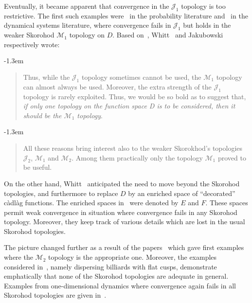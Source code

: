 \documentclass[12pt]{article}
\numberwithin{equation}{section}
\newcommand{\cJ}{{\mathcal J}}
\newcommand{\cM}{{\mathcal M}}
\begin{document}
Eventually, it became apparent that convergence in the $\cJ_1$ topology is too restrictive.
The first such examples were~\cite{AvramTaqqu92,BasrakKrizmanicSegers12} in the probability literature and~\cite{MZ15} in the dynamical systems literature, where convergence fails in $\cJ_1$ but holds in the weaker Skorohod $\cM_1$ topology on $D$.
Based on~\cite{AvramTaqqu92}, Whitt~\cite[p.~xii]{Whitt} and 
Jakubowski~\cite{Jakubowski07} 
respectively wrote:
{\advance\leftmargini -1.3em
\begin{quote}
Thus, while the $\cJ_1$ topology sometimes cannot be used, the
$\cM_1$ topology can almost always be used. Moreover, the extra strength of the $\cJ_1$
topology is rarely exploited. Thus, we would be so bold as to suggest that, \emph{if only
one topology on the function space D is to be considered, then it should be the $\cM_1$
topology}.
\end{quote}
}
{\advance\leftmargini -1.3em
\begin{quote}
All these reasons bring interest also to the
weaker Skorokhod's topologies $\cJ_2$, $\cM_1$ and $\cM_2$. Among them practically only
the topology $\cM_1$ proved to be useful.
\end{quote}
}

On the other hand, Whitt~\cite{Whitt} anticipated the need to move beyond the Skorohod topologies, and furthermore to replace $D$ by an enriched space of ``decorated'' c\`adl\`ag functions. The enriched spaces in~\cite{Whitt} were denoted by $E$ and $F$. These spaces permit weak convergence in situation where convergence fails in any Skorohod topology. Moreover, 
they keep track of various details which are lost in the usual Skorohod topologies.



The picture changed further as a result of the papers~\cite{BasrakKrizmanic14,MV20}
which gave first examples where the $\cM_2$ topology is the appropriate one.
Moreover, the examples considered in~\cite{MV20}, namely dispersing billiards with flat cusps, demonstrate emphatically that none of the Skorohod topologies are adequate in general. 
Examples from one-dimensional dynamics where convergence again fails in all Skorohod topologies are given in~\cite{Freitas2Toddsub}.
\end{document}
